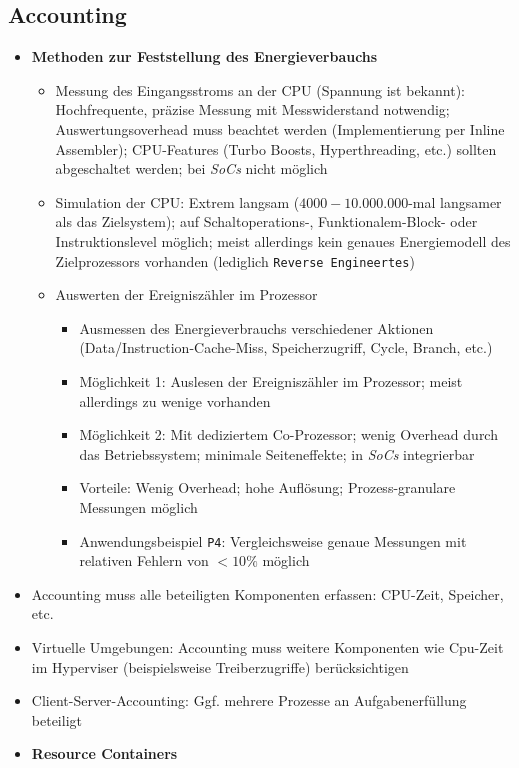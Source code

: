 \subsection{Accounting}
\begin{itemize}
	\item \textbf{Methoden zur Feststellung des Energieverbauchs}
	\begin{itemize}
		\item Messung des Eingangsstroms an der CPU (Spannung ist bekannt): Hochfrequente, präzise Messung mit Messwiderstand notwendig; Auswertungsoverhead muss beachtet werden (Implementierung per Inline Assembler); CPU-Features (Turbo Boosts, Hyperthreading, etc.) sollten abgeschaltet werden; bei \textit{SoCs} nicht möglich
		\item Simulation der CPU: Extrem langsam (\(4000-10.000.000\)-mal langsamer als das Zielsystem); auf Schaltoperations-, Funktionalem-Block- oder Instruktionslevel möglich; meist allerdings kein genaues Energiemodell des Zielprozessors vorhanden (lediglich \texttt{Reverse Engineertes})
		\item Auswerten der Ereigniszähler im Prozessor
		\begin{itemize}
			\item Ausmessen des Energieverbrauchs verschiedener Aktionen (Data/Instruction-Cache-Miss, Speicherzugriff, Cycle, Branch, etc.)
			\item Möglichkeit 1: Auslesen der Ereigniszähler im Prozessor; meist allerdings zu wenige vorhanden
			\item Möglichkeit 2: Mit dediziertem Co-Prozessor; wenig Overhead durch das Betriebssystem; minimale Seiteneffekte; in \textit{SoCs} integrierbar
			\item Vorteile: Wenig Overhead; hohe Auflösung; Prozess-granulare Messungen möglich
			\item Anwendungsbeispiel \texttt{P4}: Vergleichsweise genaue Messungen mit relativen Fehlern von \(< 10\%\) möglich
		\end{itemize}
	\end{itemize}
	\item Accounting muss alle beteiligten Komponenten erfassen: CPU-Zeit, Speicher, etc.
	\item Virtuelle Umgebungen: Accounting muss weitere Komponenten wie Cpu-Zeit im Hyperviser (beispielsweise Treiberzugriffe) berücksichtigen
	\item Client-Server-Accounting: Ggf. mehrere Prozesse an Aufgabenerfüllung beteiligt
	\item \textbf{Resource Containers}

\end{itemize}
